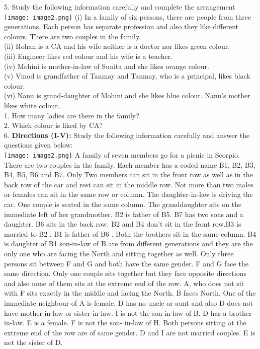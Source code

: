 \documentclass[
]{article}
\begin{document}
5. Study the following information carefully and complete the arrangement\\
\texttt{[image: image2.png]}
(i) In a family of six persons, there are people from three generations. Each person has
separate profession and also they like different colours. There are two couples in the family.\\
(ii) Rohan is a CA and his wife neither is a doctor nor likes green colour.\\
(iii) Engineer likes red colour and his wife is a teacher.\\
(iv) Mohini is mother-in-law of Sunita and she likes orange colour.\\
(v) Vinod is grandfather of Tanmay and Tanmay, who is a principal, likes black colour.\\
(vi) Nanu is grand-daughter of Mohini and she likes blue colour. Nanu’s mother likes white
colour.\\
1. How many ladies are there in the family?\\
2. Which colour is liked by CA?\\

6. \textbf{Directions (I-V):} Study the following information carefully and answer the questions given
below:\\
\texttt{[image: image2.png]}
A family of seven members go for a picnic in Scorpio. There are two couples in the family.
Each member has a coded name B1, B2, B3, B4, B5, B6 and B7. Only Two members can sit in the front
row as well as in the back row of the car and rest can sit in the middle row. Not more than
two males or females can sit in the same row or column. The daughter-in-law is driving the
car. One couple is seated in the same column. The granddaughter sits on the immediate left
of her grandmother.
B2 is father of B5. B7 has two sons and a daughter. B6 sits in the back row. B2 and B4 don’t sit in the
front row.B3 is married to B2 . B1 is father of B6 . Both the brothers sit in the same column. B4 is
daughter of B1
son-in-law of B are from different generations and they are the only one who are facing the
North and sitting together as well. Only three persons sit between F and G and both have the
same gender. F and G face the same direction. Only one couple sits together but they face
opposite directions and also none of them sits at the extreme end of the row. A, who does not
sit with F sits exactly in the middle and facing the North. B faces North. One of the immediate
neighbour of A is female. D has no uncle or aunt and also D does not have mother-in-law or
sister-in-law. I is not the son-in-law of B. D has a brother-in-law. E is a female. F is not the son-
in-law of H. Both persons sitting at the extreme end of the row are of same gender. D and I
are not married couples. E is not the sister of D.\\
\end{document}
